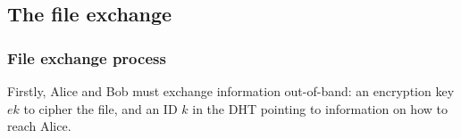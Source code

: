 
\subsection{The file exchange}%
\label{file-exchange}

\subsubsection{File exchange process}%
\label{ssub:file_exchange_process}

Firstly, Alice and Bob must exchange information out-of-band: an encryption key $ek$ to cipher the file, and an ID $k$ in the DHT pointing to information on how to reach Alice.

